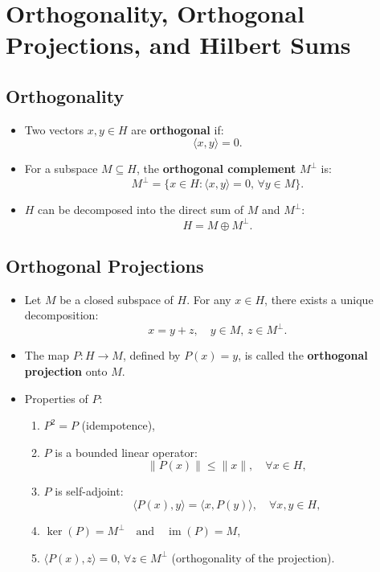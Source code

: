\documentclass{article}
\begin{document}
\section{Orthogonality, Orthogonal Projections, and Hilbert Sums}

\subsection*{Orthogonality}
\begin{itemize}
    \item Two vectors \( x, y \in H \) are \textbf{orthogonal} if:
    \[
    \langle x, y \rangle = 0.
    \]
    \item For a subspace \( M \subseteq H \), the \textbf{orthogonal complement} \( M^\perp \) is:
    \[
    M^\perp = \{x \in H : \langle x, y \rangle = 0, \, \forall y \in M\}.
    \]
    \item \( H \) can be decomposed into the direct sum of \( M \) and \( M^\perp \):
    \[
    H = M \oplus M^\perp.
    \]
\end{itemize}

\subsection*{Orthogonal Projections}
\begin{itemize}
    \item Let \( M \) be a closed subspace of \( H \). For any \( x \in H \), there exists a unique decomposition:
    \[
    x = y + z, \quad y \in M, \, z \in M^\perp.
    \]
    \item The map \( P : H \to M \), defined by \( P(x) = y \), is called the \textbf{orthogonal projection} onto \( M \).
    \item Properties of \( P \):
    \begin{enumerate}
        \item \( P^2 = P \) (idempotence),
        \item \( P \) is a bounded linear operator: 
        \[
        \|P(x)\| \leq \|x\|, \quad \forall x \in H,
        \]
        \item \( P \) is self-adjoint:
        \[
        \langle P(x), y \rangle = \langle x, P(y) \rangle, \quad \forall x, y \in H,
        \]
        \item \( \ker(P) = M^\perp \quad \text{and} \quad \operatorname{im}(P) = M \),
        \item \( \langle P(x), z \rangle = 0, \, \forall z \in M^\perp \) (orthogonality of the projection).
    \end{enumerate}
\end{itemize}
\end{document}
